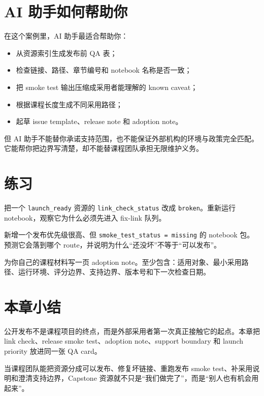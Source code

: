 \section{AI 助手如何帮助你}

在这个案例里，AI 助手最适合帮助你：

\begin{itemize}
    \item 从资源索引生成发布前 QA 表；
    \item 检查链接、路径、章节编号和 notebook 名称是否一致；
    \item 把 smoke test 输出压缩成采用者能理解的 known caveat；
    \item 根据课程长度生成不同采用路径；
    \item 起草 issue template、release note 和 adoption note。
\end{itemize}

但 AI 助手不能替你承诺支持范围，也不能保证外部机构的环境与政策完全匹配。它能帮你把边界写清楚，却不能替课程团队承担无限维护义务。

\section{练习}

\begin{exercisebox}[基础练习]
把一个 \texttt{launch\_ready} 资源的 \texttt{link\_check\_status} 改成 \texttt{broken}。重新运行 notebook，观察它为什么必须先进入 fix-link 队列。
\end{exercisebox}

\begin{exercisebox}[进阶练习]
新增一个发布优先级很高、但 \texttt{smoke\_test\_status = missing} 的 notebook 包。预测它会落到哪个 route，并说明为什么“还没坏”不等于“可以发布”。
\end{exercisebox}

\begin{exercisebox}[开放练习]
为你自己的课程材料写一页 adoption note。至少包含：适用对象、最小采用路径、运行环境、评分边界、支持边界、版本号和下一次检查日期。
\end{exercisebox}

\section{本章小结}

公开发布不是课程项目的终点，而是外部采用者第一次真正接触它的起点。本章把 link check、release smoke test、adoption note、support boundary 和 launch priority 放进同一张 QA card。

当课程团队能把资源分成可以发布、修复坏链接、重跑发布 smoke test、补采用说明和澄清支持边界，Capstone 资源就不只是“我们做完了”，而是“别人也有机会用起来”。
